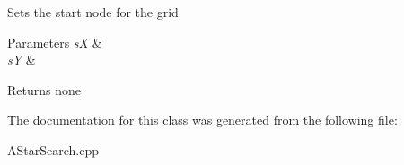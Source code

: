 Sets the start node for the grid


\begin{DoxyParams}{Parameters}
{\em sX} & \\
\hline
{\em sY} & \\
\hline
\end{DoxyParams}
\begin{DoxyReturn}{Returns}
none 
\end{DoxyReturn}


The documentation for this class was generated from the following file\+:\begin{DoxyCompactItemize}
\item 
A\+Star\+Search.\+cpp\end{DoxyCompactItemize}
